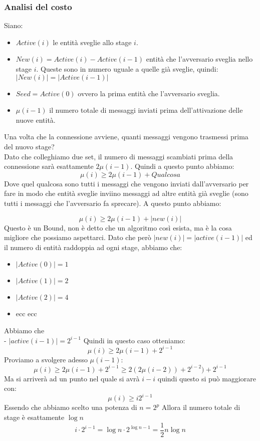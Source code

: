 \subsubsection{Analisi del costo}
Siano:
\begin{itemize}
    \item $Active(i)$ le entità sveglie allo stage $i$.
    \item $New(i) = Active(i) - Active(i-1)$  entità che l'avversario sveglia
          nello stage $i$. Queste sono in numero uguale a quelle già sveglie, quindi:
          $|New(i)|=|Active(i-1)|$
    \item $Seed = Active(0)$ ovvero la prima entità che l'avversario sveglia.
    \item $\mu(i-1)$ il numero totale di messaggi inviati prima dell'attivazione
          delle nuove entità.%
\end{itemize}
Una volta che la connessione avviene, quanti messaggi vengono trasmessi prima
del nuovo stage?\\
Dato che colleghiamo due set, il numero di messaggi scambiati prima della
connessione sarà esattamente $2\mu(i-1)$. Quindi a questo punto abbiamo:
$$\mu(i) \geq 2\mu(i-1) + Qualcosa$$ Dove quel qualcosa sono tutti i messaggi
che vengono inviati dall'avversario per fare in modo che entità sveglie inviino
messaggi ad altre entità già sveglie (sono tutti i messaggi che l'avversario fa
sprecare). A questo punto abbiamo:

$$\mu(i) \geq 2\mu(i-1) + |new(i)|$$ Questo è un Bound, non è detto che un
algoritmo così esista, ma è la cosa migliore che possiamo aspettarci. Dato che
però $|new(i)|=|active(i-1)|$ ed il numero di entità raddoppia ad ogni stage,
abbiamo che:
\begin{itemize}
    \item $|Active(0)| = 1$
    \item $|Active(1)| = 2$
    \item $|Active(2)| = 4$
    \item ecc ecc
\end{itemize}
Abbiamo che \\
- $|active(i-1)| = 2^{i-1}$ Quindi in questo caso otteniamo:
$$\mu(i) \geq 2\mu(i-1)+2^{i-1}$$ Proviamo a svolgere adesso $\mu(i-1)$:
$$\mu(i) \geq 2\mu(i-1)+2^{i-1} \geq 2(2\mu(i-2))+2^{i-2})+2^{i-1}$$ Ma si
arriverà ad un punto nel quale si avrà $i-i$ quindi questo si può maggiorare
con:
$$\mu(i) \geq i2^{i-1}$$ Essendo che abbiamo scelto una potenza di $n=2^p$
Allora il numero totale di stage è esattamente $\log n$
$$i \cdot 2^{i-1} = \log n \cdot 2^{\log n-1} = {\frac{1}{2}} n \log n$$

